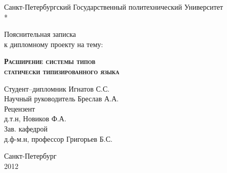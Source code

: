 \begin{titlepage}
\newpage

\begin{center}
Санкт-Петербургский Государственный политехнический Университет \\*
\hrulefill
\end{center}


\vspace{8em}

\begin{center}
\Large Пояснительная записка \\ к дипломному проекту на тему:
\end{center}

\vspace{2.5em}

\begin{center}
\textsc{\textbf{Расширение системы типов \\ статически типизированного языка}}
\end{center}

\vspace{6em}

\begin{flushleft}
Студент--дипломник \hrulefill Игнатов С.С. \\
\vspace{1.5em}
Научный руководитель \hrulefill Бреслав А.А.\\
\vspace{1.5em}
Рецензент \\
д.т.н, \hrulefill Новиков Ф.А.\\
\vspace{1.5em}
Зав. кафедрой  \\
д.ф-м.н, профессор \hrulefill Григорьев Б.С.
\end{flushleft}

\vspace{\fill}

\begin{center}
Санкт-Петербург \\ 2012
\end{center}

\end{titlepage}